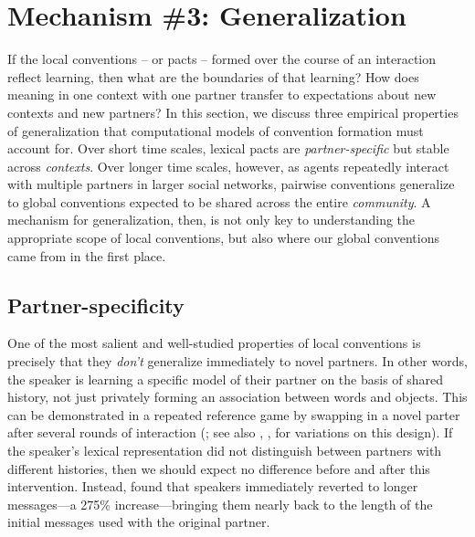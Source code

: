 \section{Mechanism \#3: Generalization}

If the local conventions -- or pacts -- formed over the course of an interaction reflect learning, then what are the boundaries of that learning? How does meaning in one context with one partner transfer to expectations about new contexts and new partners? %
In this section, we discuss three empirical properties of generalization that computational models of convention formation must account for. Over short time scales, lexical pacts are \emph{partner-specific} but stable across \emph{contexts}. 
Over longer time scales, however, as agents repeatedly interact with multiple partners in larger social networks, pairwise conventions generalize to global conventions expected to be shared across the entire \emph{community}.
A mechanism for generalization, then, is not only key to understanding the appropriate scope of local conventions, but also where our global conventions came from in the first place.

\subsection{Partner-specificity}

One of the most salient and well-studied properties of local conventions is precisely that they \emph{don't} generalize immediately to novel partners. In other words, the speaker is learning a specific model of their partner on the basis of shared history, not just privately forming an association between words and objects. This can be demonstrated in a repeated reference game by  swapping in a novel parter after several rounds of interaction (; see also , ,  for variations on this design). If the speaker's lexical representation did not distinguish between partners with different histories, then we should expect no difference before and after this intervention. Instead,  found that speakers immediately reverted to longer messages---a 275\% increase---bringing them nearly back to the length of the initial messages used with the original partner. 

